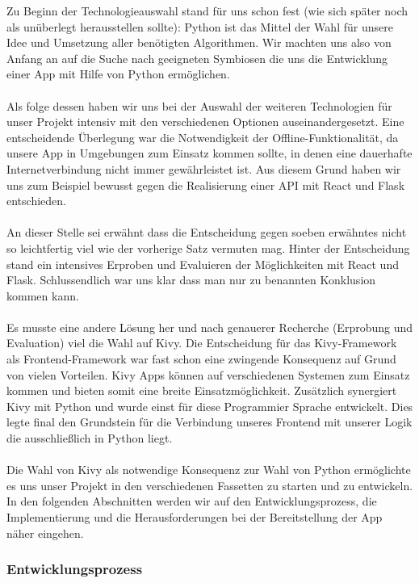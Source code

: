 		Zu Beginn der Technologieauswahl stand für uns schon fest (wie sich später noch als unüberlegt herausstellen sollte): Python ist das Mittel der Wahl für unsere Idee und Umsetzung aller benötigten Algorithmen. Wir machten uns also von Anfang an auf die Suche nach geeigneten Symbiosen die uns die Entwicklung einer App mit Hilfe von Python ermöglichen.
		\\\\
		Als folge dessen haben wir uns bei der Auswahl der weiteren Technologien für unser Projekt intensiv mit den verschiedenen Optionen auseinandergesetzt. Eine entscheidende Überlegung war die Notwendigkeit der Offline-Funktionalität, da unsere App in Umgebungen zum Einsatz kommen sollte, in denen eine dauerhafte Internetverbindung nicht immer gewährleistet ist. Aus diesem Grund haben wir uns zum Beispiel bewusst gegen die Realisierung einer API mit React und Flask entschieden.
		\\\\
		An dieser Stelle sei erwähnt dass die Entscheidung gegen soeben erwähntes nicht so leichtfertig viel wie der vorherige Satz vermuten mag. Hinter der Entscheidung stand ein intensives Erproben und Evaluieren der Möglichkeiten mit React und Flask. Schlussendlich war uns klar dass man nur zu benannten Konklusion kommen kann.
		\\\\
		Es musste eine andere Lösung her und nach genauerer Recherche (Erprobung und Evaluation) viel die Wahl auf Kivy. Die Entscheidung für das Kivy-Framework als Frontend-Framework war fast schon eine zwingende Konsequenz auf Grund von vielen Vorteilen. Kivy Apps können auf verschiedenen Systemen zum Einsatz kommen und bieten somit eine breite Einsatzmöglichkeit. Zusätzlich synergiert Kivy mit Python und wurde einst für diese Programmier Sprache entwickelt. Dies legte final den Grundstein für die Verbindung unseres Frontend mit unserer Logik die ausschließlich in Python liegt. 
		\\\\
		Die Wahl von Kivy als notwendige Konsequenz zur Wahl von Python ermöglichte es uns unser Projekt in den verschiedenen Fassetten zu starten und zu entwickeln. In den folgenden Abschnitten werden wir auf den Entwicklungsprozess, die Implementierung und die Herausforderungen bei der Bereitstellung der App näher eingehen.
		
	\subsubsection{Entwicklungsprozess}
	\label{sssec:entwicklung}
		
